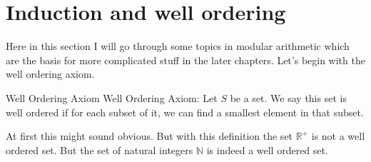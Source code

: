 \section{Induction and well ordering}

Here in this section I will go through some topics in modular arithmetic which are the basis for more complicated stuff in the later chapters. Let's begin with the well ordering axiom.

\begin{defbox}{Well Ordering Axiom}
	Well Ordering Axiom: Let $ S $ be a set. We say this set is well ordered if for each subset of it, we can find a smallest element in that subset. 
\end{defbox}

At first this might sound obvious. But with this definition the set $ \mathbb{R}^{+} $ is not a well ordered set. But the set of natural integers $ \mathbb{N} $ is indeed a well ordered set. 